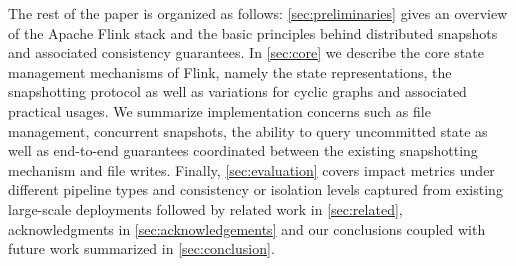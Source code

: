 The rest of the paper is organized as follows: \autoref{sec:preliminaries} gives an overview of the Apache Flink stack and the basic principles behind distributed snapshots and associated consistency guarantees. In \autoref{sec:core} we describe the core state management mechanisms of Flink, namely the state representations, the snapshotting protocol as well as variations for cyclic graphs and associated practical usages. We summarize implementation concerns such as file management, concurrent snapshots, the ability to query uncommitted state as well as end-to-end guarantees coordinated between the existing snapshotting mechanism and file writes. Finally, \autoref{sec:evaluation} covers impact metrics under different pipeline types and consistency or isolation levels captured from existing large-scale deployments followed by related work in \autoref{sec:related}, acknowledgments in \autoref{sec:acknowledgements} and our conclusions coupled with future work summarized in \autoref{sec:conclusion}.
